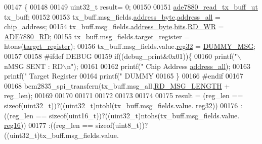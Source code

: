 \begin{DoxyCode}
00147                                                                                                     \{
00148    
00149   uint32\_t result= 0;
00150 
00151     \hyperlink{a00016}{ade7880\_read\_tx\_buff\_ut} tx\_buff;
00152     
00153     tx\_buff.msg\_fields.\hyperlink{a00016_af6a65bac733ea3e9b1d24b065163d49a}{address\_byte}.\hyperlink{a00011_a7bf6defa0ae3fb2bca057a3a97d4f740}{address\_all} = chip\_address;
00154     tx\_buff.msg\_fields.\hyperlink{a00016_af6a65bac733ea3e9b1d24b065163d49a}{address\_byte}.\hyperlink{a00011_ae121725fb28cc26495969d71e0e0d42e}{bits}.\hyperlink{a00011_a97e2668c8e5470fa66185f16dc2e8045}{RD\_WR} = \hyperlink{a00041_a30e8f63608e6153585d75dc479a03177}{ADE7880\_RD};
00155     tx\_buff.msg\_fields.target\_register = htons(\hyperlink{a00041_ac02048009fa6718e40f028b6bae63f3d}{target\_register});
00156     tx\_buff.msg\_fields.value.\hyperlink{a00016_a83e2be8d3feb1bcbc286bfaae10ac552}{reg32} = \hyperlink{a00041_af87bc226c5bc1e648d8ceac69ccf2bcb}{DUMMY\_MSG};
00157 
00158 \textcolor{preprocessor}{    #ifdef DEBUG}
00159 \textcolor{preprocessor}{}     \textcolor{keywordflow}{if}((debug\_print&0x01))\{
00160        printf(\textcolor{stringliteral}{"\(\backslash\)nMSG SENT  : RD\(\backslash\)n"});
00161        
00162        printf(\textcolor{stringliteral}{"        Chip Address %
      \hyperlink{a00011_a7bf6defa0ae3fb2bca057a3a97d4f740}{address\_all});
00163        printf(\textcolor{stringliteral}{"        Target Register %
00164        printf(\textcolor{stringliteral}{"        DUMMY %
00165        \}
00166 \textcolor{preprocessor}{    #endif}
00167 \textcolor{preprocessor}{}    
00168     bcm2835\_spi\_transfern(tx\_buff.msg\_all,\hyperlink{a00041_a0f0795755fb9e8e47c78c1289e091282}{RD\_MSG\_LENGTH} + reg\_len);    
00169     
00170     
00171               
00172     
00173     
00174     
00175     result =  (reg\_len == \textcolor{keyword}{sizeof}(uint32\_t))?((uint32\_t)ntohl(tx\_buff.msg\_fields.value.
      \hyperlink{a00016_a83e2be8d3feb1bcbc286bfaae10ac552}{reg32}))
00176              :((reg\_len == \textcolor{keyword}{sizeof}(uint16\_t))?((uint32\_t)ntohs(tx\_buff.msg\_fields.value.
      \hyperlink{a00016_a0c22d234d52e616d449a8c264bf2030b}{reg16}))
00177              :((reg\_len == \textcolor{keyword}{sizeof}(uint8\_t))?((uint32\_t)tx\_buff.msg\_fields.value.
}}}
\end{DoxyCode}
